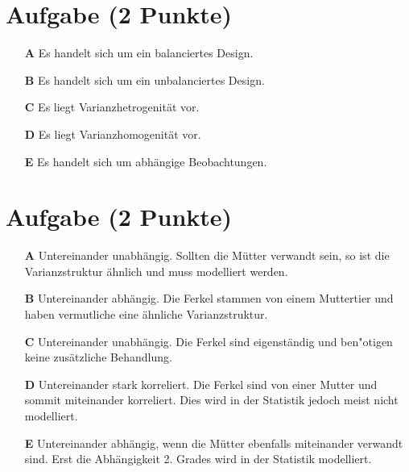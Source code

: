 \documentclass[a4paper, 9pt]{scrartcl}\usepackage[]{graphicx}\usepackage[]{xcolor}
\makeatletter
\newenvironment{kframe}{%
 \def\at@end@of@kframe{}%
 \ifinner\ifhmode%
  \def\at@end@of@kframe{\end{minipage}}%
  \begin{minipage}{\columnwidth}%
 \fi\fi%
 \def\FrameCommand##1{\hskip\@totalleftmargin \hskip-\fboxsep
 \colorbox{shadecolor}{##1}\hskip-\fboxsep
     \hskip-\linewidth \hskip-\@totalleftmargin \hskip\columnwidth}%
 \MakeFramed {\advance\hsize-\width
   \@totalleftmargin\z@ \linewidth\hsize
   \@setminipage}}%
 {\par\unskip\endMakeFramed%
 \at@end@of@kframe}
\newenvironment{knitrout}{}{} %
\makeatother
\begin{document}
\section{Aufgabe \hfill (2 Punkte)}

\begin{knitrout}
\color{fgcolor}\begin{kframe}


{\ttfamily\noindent\bfseries{}}\end{kframe}
\end{knitrout}





\begin{enumerate}
\item [\textbf{A} \msquare] Es handelt sich um ein balanciertes Design.
\item [\textbf{B} \msquare] Es handelt sich um ein unbalanciertes Design.
\item [\textbf{C} \msquare] Es liegt Varianzhetrogenität vor.
\item [\textbf{D} \msquare] Es liegt Varianzhomogenität vor.
\item [\textbf{E} \msquare] Es handelt sich um abhängige Beobachtungen.
\end{enumerate}

\section{Aufgabe \hfill (2 Punkte)}







\begin{enumerate}
\item [\textbf{A} \msquare] Untereinander unabhängig. Sollten die Mütter verwandt sein, so ist die Varianzstruktur ähnlich und muss modelliert werden.
\item [\textbf{B} \msquare] Untereinander abhängig. Die Ferkel stammen von einem Muttertier und haben vermutliche eine ähnliche Varianzstruktur.
\item [\textbf{C} \msquare] Untereinander unabhängig. Die Ferkel sind eigenständig und ben{"o}tigen keine zusätzliche Behandlung.
\item [\textbf{D} \msquare] Untereinander stark korreliert. Die Ferkel sind von einer Mutter und sommit miteinander korreliert. Dies wird in der Statistik jedoch meist nicht modelliert.
\item [\textbf{E} \msquare] Untereinander abhängig, wenn die Mütter ebenfalls miteinander verwandt sind. Erst die Abhängigkeit 2. Grades wird in der Statistik modelliert.
\end{enumerate}
\end{document}
